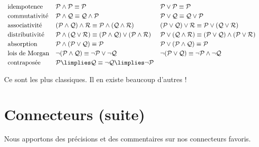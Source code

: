 \documentclass[11pt,class=report,crop=false]{standalone}
\begin{document}
\[
\begin{array}{l l l}
	\text{idempotence} 
	& \mathcal{P}\land\mathcal{P} \equiv \mathcal{P}
	& \mathcal{P}\lor\mathcal{P} \equiv \mathcal{P}
	\\[0.6ex]
	
	\text{commutativité}
	& \mathcal{P}\land\mathcal{Q} \equiv \mathcal{Q}\land\mathcal{P}
	& \mathcal{P}\lor\mathcal{Q} \equiv \mathcal{Q}\lor\mathcal{P}
	\\[0.6ex]
	
	\text{associativité}
	& (\mathcal{P}\land\mathcal{Q})\land\mathcal{R} \equiv \mathcal{P}\land(\mathcal{Q}\land\mathcal{R})
	& (\mathcal{P}\lor\mathcal{Q})\lor\mathcal{R} \equiv \mathcal{P}\lor(\mathcal{Q}\lor\mathcal{R})
	\\[0.6ex]
	
	\text{distributivité}
	& \mathcal{P}\land(\mathcal{Q}\lor\mathcal{R}) \equiv (\mathcal{P}\land\mathcal{Q}) \lor (\mathcal{P}\land\mathcal{R})
	& \mathcal{P}\lor(\mathcal{Q}\land\mathcal{R}) \equiv (\mathcal{P}\lor\mathcal{Q}) \land (\mathcal{P}\lor\mathcal{R})
	\\[0.6ex]
	
	\text{absorption}
	& \mathcal{P}\land(\mathcal{P}\lor\mathcal{Q}) \equiv \mathcal{P}
	& \mathcal{P}\lor(\mathcal{P}\land\mathcal{Q}) \equiv \mathcal{P}
	\\[0.6ex]
	
	\text{lois de Morgan}
	& \lnot(\mathcal{P}\land\mathcal{Q}) \equiv \lnot\mathcal{P}\lor\lnot\mathcal{Q}
	& \lnot(\mathcal{P}\lor\mathcal{Q}) \equiv \lnot\mathcal{P}\land\lnot\mathcal{Q}
	\\[0.6ex]
	
	\text{contraposée}
	& \mathcal{P}\limplies\mathcal{Q} \equiv \lnot\mathcal{Q}\limplies\lnot\mathcal{P}
	& \\
\end{array}
\]

\medskip

Ce sont les plus classiques. Il en existe beaucoup d'autres !



\section{Connecteurs (suite)}
\label{sec:connecteursbis}

Nous apportons des précisions et des commentaires sur nos connecteurs favoris.
\end{document}
